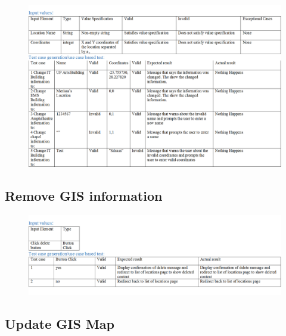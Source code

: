 \documentclass[english]{article}
\begin{document}
\begin{figure}[H]

    \label{tab:example}

\hspace*{-2.5cm} 

\includegraphics[width=180mm]{ModifyGISInformation.png}

\end{figure}




\subsection{Remove GIS information}

\begin{figure}[ht!]

\hspace*{-2.5cm} 

\includegraphics[width=180mm]{DeleteGISInformation.png}

\end{figure}


\subsection{Update GIS Map}
\end{document}
